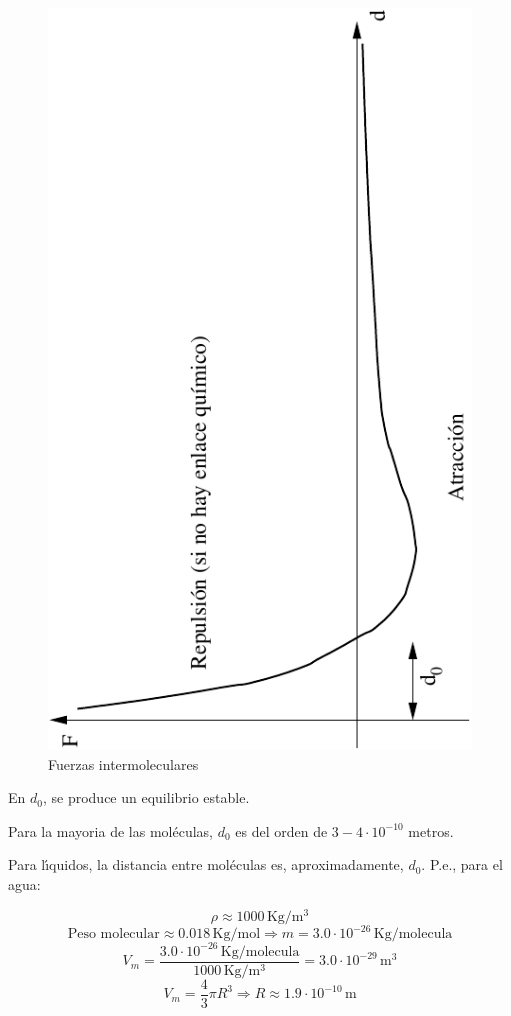 \begin{figure}
	\centering       \includegraphics[scale=1,angle=270]{TeX_files/chapter01-Introduccion/fuerzas_molec.pdf}
	\caption{Fuerzas intermoleculares}
	
\end{figure}

En $d_0$, se produce un equilibrio estable.

Para la mayoria de las mol\'eculas, $d_0$ es del orden de  $3-4\cdot10^{-10}$ metros.

Para l\'{\i}quidos, la distancia entre mol\'eculas es, aproximadamente, $d_0$. P.e., para el agua:

$$
\rho \approx 1000 \, \textrm{Kg}/\textrm{m}^3
$$
$$
\textrm{Peso molecular} \approx 0.018 \, \textrm{Kg}/\textrm{mol} \Rightarrow
m = 3.0 \cdot 10^{-26} \, \textrm{Kg}/\textrm{molecula}
$$
$$
V_m = \frac{3.0 \cdot 10^{-26} \, \textrm{Kg}/\textrm{molecula}}{1000 \, \textrm{Kg}/\textrm{m}^3}
=3.0 \cdot 10^{-29} \, \textrm{m}^3
$$
$$
V_m = \frac{4}{3} \pi R^3 \Rightarrow R \approx 1.9 \cdot 10^{-10} \, \textrm{m}
$$

